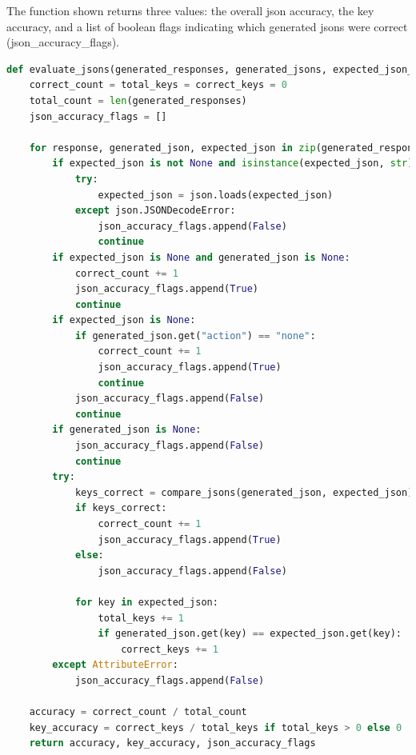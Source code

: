The function shown returns three values: the overall \gls{json} accuracy, the key accuracy, and a list of boolean flags indicating which generated \glspl{json} were correct (json\_accuracy\_flags).

\begin{Listing}
    \begin{lstlisting}[language=Python]
def evaluate_jsons(generated_responses, generated_jsons, expected_json_values):
    correct_count = total_keys = correct_keys = 0
    total_count = len(generated_responses)
    json_accuracy_flags = []

    for response, generated_json, expected_json in zip(generated_responses, generated_jsons, expected_json_values):
        if expected_json is not None and isinstance(expected_json, str):
            try:
                expected_json = json.loads(expected_json)
            except json.JSONDecodeError:
                json_accuracy_flags.append(False)
                continue        
        if expected_json is None and generated_json is None:
            correct_count += 1
            json_accuracy_flags.append(True)
            continue
        if expected_json is None:
            if generated_json.get("action") == "none": 
                correct_count += 1
                json_accuracy_flags.append(True)
                continue
            json_accuracy_flags.append(False)
            continue        
        if generated_json is None:
            json_accuracy_flags.append(False)
            continue
        try:
            keys_correct = compare_jsons(generated_json, expected_json)
            if keys_correct:
                correct_count += 1
                json_accuracy_flags.append(True)
            else:
                json_accuracy_flags.append(False)
            
            for key in expected_json:
                total_keys += 1
                if generated_json.get(key) == expected_json.get(key):
                    correct_keys += 1
        except AttributeError:
            json_accuracy_flags.append(False)
    
    accuracy = correct_count / total_count
    key_accuracy = correct_keys / total_keys if total_keys > 0 else 0
    return accuracy, key_accuracy, json_accuracy_flags
  \end{lstlisting}
    \caption{Code for Classificiation of the models responded JSONs}
    \label{lst:evalMetrics1}
\end{Listing}


